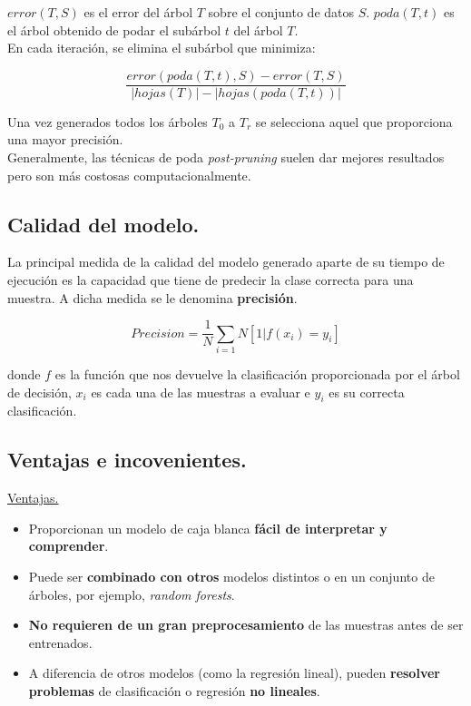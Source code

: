 $error(T, S)$ es el error del árbol $T$ sobre el conjunto de datos $S$. $poda(T, t)$ es el árbol obtenido de podar el subárbol $t$ del árbol $T$.\\

En cada iteración, se elimina el subárbol que minimiza:

$$
\frac{error(poda(T, t), S) - error(T, S)}{|hojas(T)| - |hojas(poda(T, t))|}
$$

Una vez generados todos los árboles $T_0$ a $T_r$ se selecciona aquel que proporciona una mayor precisión.\\

Generalmente, las técnicas de poda \textit{post-pruning} suelen dar mejores resultados pero son más costosas computacionalmente.
\subsection{Calidad del modelo.}
La principal medida de la calidad del modelo generado aparte de su tiempo de ejecución es la capacidad que tiene de predecir la clase correcta para una muestra. A dicha medida se le denomina \textbf{precisión}.

$$
Precision = \frac{1}{N}\sum_{i=1}{N}[1|f(x_i) = y_i]
$$

donde $f$ es la función que nos devuelve la clasificación proporcionada por el árbol de decisión, $x_i$ es cada una de las muestras a evaluar e $y_i$ es su correcta clasificación.

\subsection{Ventajas e incovenientes.}
\underline{Ventajas.}
\begin{itemize}
	\item Proporcionan un modelo de caja blanca \textbf{fácil de interpretar y comprender}.
	\item Puede ser \textbf{combinado con otros} modelos distintos o en un conjunto de árboles, por ejemplo, \textit{random forests}.
	\item \textbf{No requieren de un gran preprocesamiento} de las muestras antes de ser entrenados.
	\item A diferencia de otros modelos (como la regresión lineal), pueden \textbf{resolver problemas} de clasificación o regresión \textbf{no lineales}.\\
\end{itemize}

